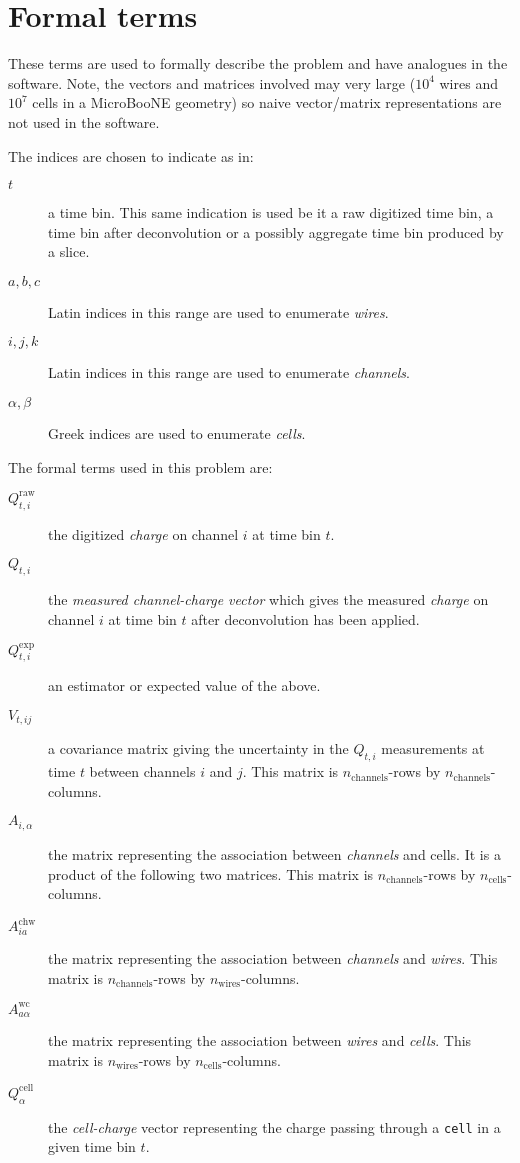 \documentclass[letter]{article}
\def\mQraw{Q^{\mathrm{raw}}_{t,i}}
\def\Qraw{$\mQraw$\xspace}
\def\mQdec{Q_{t,i}}
\def\Qdec{$\mQdec$\xspace}
\def\mQexp{Q^{\mathrm{exp}}_{t,i}}
\def\Qexp{$\mQexp$\xspace}
\def\mVcov{V_{t,ij}}
\def\Vcov{$\mVcov$\xspace}
\def\mAchc{A_{i,\alpha}}
\def\Achc{$\mAchc$\xspace}
\def\mAchw{A^{\mathrm{chw}}_{ia}}
\def\Achw{$\mAchw$\xspace}
\def\mAwc{A^{\mathrm{wc}}_{a\alpha}}
\def\Awc{$\mAwc$\xspace}
\def\mQcell{Q^{\mathrm{cell}}_\alpha}
\def\Qcell{$\mQcell$\xspace}
\begin{document}
\section{Formal terms}

These terms are used to formally describe the problem and have
analogues in the software.
Note, the vectors and matrices involved may very large ($10^4$ wires
and $10^7$ cells in a MicroBooNE geometry) so naive vector/matrix
representations are not used in the software.

\noindent The indices are chosen to indicate as in:
\begin{description}
\item[$t$] a time bin.
  This same indication is used be it a raw digitized time bin, a time
  bin after deconvolution or a possibly aggregate time bin produced by
  a slice.
\item[$a,b,c$] Latin indices in this range are used to enumerate \textit{wires}.
\item[$i,j,k$] Latin indices in this range are used to enumerate \textit{channels}.
\item[$\alpha,\beta$] Greek indices are used to enumerate \textit{cells}.
\end{description}

\noindent The formal terms used in this problem are:
\begin{description}
\item[\Qraw] the digitized \textit{charge} on channel $i$ at
  time bin $t$.
\item[\Qdec] the \textit{measured channel-charge vector} which gives the measured \textit{charge} on channel $i$ at
  time bin $t$ after deconvolution has been applied.
\item[\Qexp] an estimator or expected value of the above.
\item[\Vcov] a covariance matrix giving the 
  uncertainty in the \Qdec measurements at time $t$ between channels
  $i$ and $j$.
  This matrix is $n_\mathrm{channels}$-rows by $n_\mathrm{channels}$-columns.
\item[\Achc] the matrix representing the association between \textit{channels} and {cells}.
  It is a product of the following two matrices.
  This matrix is $n_\mathrm{channels}$-rows by $n_\mathrm{cells}$-columns.
\item[\Achw] the matrix representing the association between
  \textit{channels} and \textit{wires}.
  This matrix is $n_\mathrm{channels}$-rows by $n_\mathrm{wires}$-columns.
\item[\Awc] the matrix representing the association between
  \textit{wires} and \textit{cells}.
  This matrix is $n_\mathrm{wires}$-rows by $n_\mathrm{cells}$-columns.
\item[\Qcell] the \textit{cell-charge} vector representing the charge passing
  through a \texttt{cell} in a given time bin $t$.
\end{description}
\end{document}
